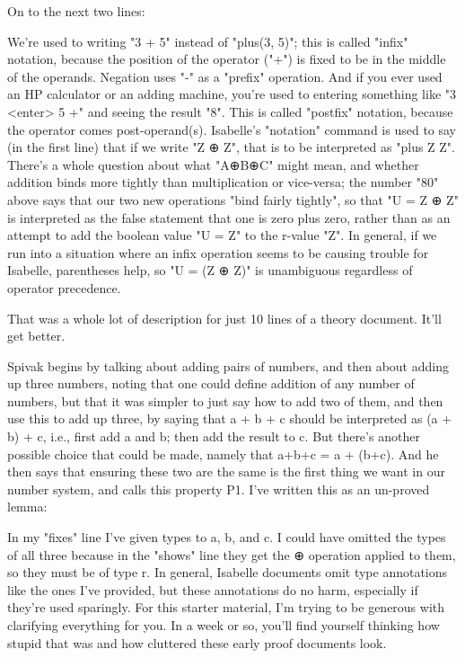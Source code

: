 On to the next two lines:

We're used to writing "3 + 5" instead of "plus(3, 5)"; this is called "infix" notation, because the position of the operator ("+") is fixed to be in the middle of the operands. Negation uses "-" as a "prefix" operation. And if you ever used an HP calculator or an adding machine, you're used to entering something like "3 <enter> 5 +" and seeing the result "8". This is called "postfix" notation, because the operator comes post-operand(s). Isabelle's "notation" command is used to say (in the first line) that if we write "Z ⊕ Z", that is to be interpreted as "plus Z Z". There's a whole question about what "A⊕B⊕C" might mean, and whether addition binds more tightly than multiplication or vice-versa; the number "80" above says that our two new operations "bind fairly tightly", so that "U = Z ⊕ Z" is interpreted as the false statement that one is zero plus zero, rather than as an attempt to add the boolean value "U = Z" to the r-value "Z". In general, if we run into a situation where an infix operation seems to be causing trouble for Isabelle, parentheses help, so "U = (Z ⊕ Z)" is unambiguous regardless of operator precedence. 

That was a whole lot of description for just 10 lines of a theory document. It'll get better. 

Spivak begins by talking about adding pairs of numbers, and then about adding up three numbers, noting that one could define addition of any number of numbers, but that it was simpler to just say how to add two of them, and then use this to add up three, by saying that a + b + c should be interpreted as (a + b) + c, i.e., first add a and b; then add the result to c. But there's another possible choice that could be made, namely that a+b+c = a + (b+c). And he then says that ensuring these two are the same is the first thing we want in our number system, and calls this property P1. I've written this as an un-proved lemma: 

In my "fixes" line I've given types to a, b, and c. I could have omitted the types of all three because in the "shows" line they get the ⊕ operation applied to them, so they must be of type r. In general, Isabelle documents omit type annotations like the ones I've provided, but these annotations do no harm, especially if they're used sparingly. For this starter material, I'm trying to be generous with clarifying everything for you. In a week or so, you'll find yourself thinking how stupid that was and how cluttered these early proof documents look. 

